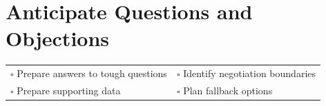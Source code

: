 
\section{Anticipate Questions and Objections}
\label{sec:questions}

\begin{tabular}{p{9cm} p{8cm}}
$\square$ Prepare answers to tough questions & $\square$ Identify negotiation boundaries \\ 
$\square$ Prepare supporting data & $\square$ Plan fallback options \\ 
\end{tabular}


